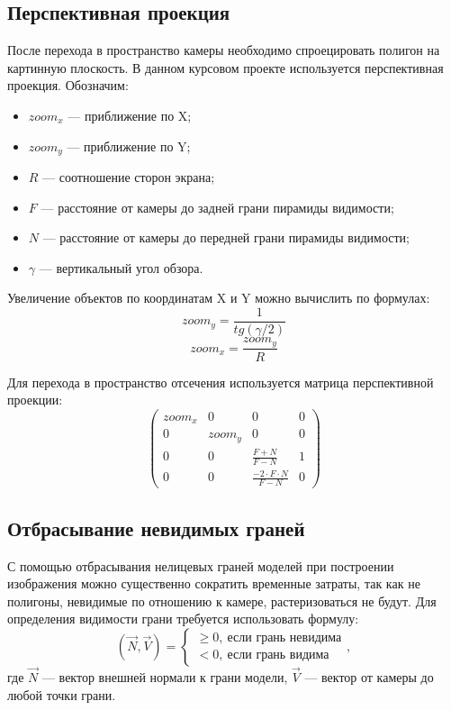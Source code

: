 \subsection{Перспективная проекция}

После перехода в пространство камеры необходимо спроецировать полигон на картинную плоскость.
В данном курсовом проекте используется перспективная проекция.
Обозначим:
\begin{itemize}
	\item $zoom_x$ --- приближение по X;
	\item $zoom_y$ --- приближение по Y;
	\item $R$ --- соотношение сторон экрана;
	\item $F$ --- расстояние от камеры до задней грани пирамиды видимости;
	\item $N$ --- расстояние от камеры до передней грани пирамиды видимости;
	\item $\gamma$ --- вертикальный угол обзора.
\end{itemize}
Увеличение объектов по координатам X и Y можно вычислить по формулах:
\begin{equation}
	zoom_y = \frac{1}{tg(\gamma / 2)}
\end{equation}
\begin{equation}
	zoom_x = \frac{zoom_y}{R}
\end{equation}

Для перехода в пространство отсечения используется матрица перспективной проекции:
\begin{equation}
	\begin{pmatrix}
		zoom_x  & 0  & 0  & 0 \\
		0   & zoom_y  & 0  & 0 \\
		0   & 0   & \frac{F + N}{F - N}  & 1 \\
		0   & 0   & \frac{-2 \cdot F \cdot N}{F - N}  & 0
	\end{pmatrix}
\end{equation}

\subsection{Отбрасывание невидимых граней}

С помощью отбрасывания нелицевых граней моделей при построении изображения можно существенно сократить временные затраты, так как не полигоны, невидимые по отношению к камере, растеризоваться не будут.
Для определения видимости грани требуется использовать формулу:
\begin{equation}
	(\overrightarrow{N}, \overrightarrow{V}) = \begin{cases}
		 \geq 0,~\text{если грань невидима} \\
		 < 0,~\text{если грань видима}
	\end{cases},
\end{equation}
где $\overrightarrow{N}$ --- вектор внешней нормали к грани модели, $\overrightarrow{V}$ --- вектор от камеры до любой точки грани.


